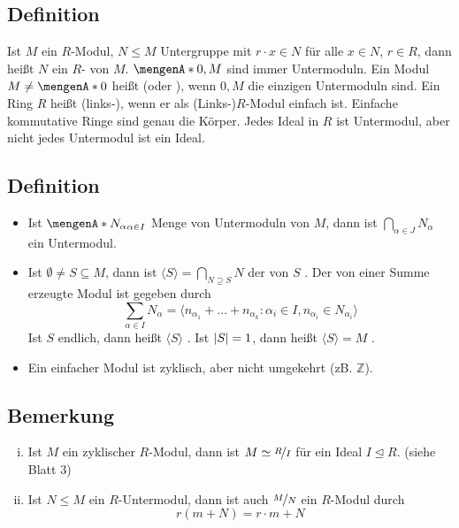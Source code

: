 \subsection[Definition: Untermodul, einfache Moduln und Ringe]{Definition} %
\label{sub:24}
Ist $M$ ein $R$-Modul, $N \le M$ Untergruppe mit $r \cdot x \in N$ für alle $x \in N$, $r \in R$, dann heißt $N$ ein $R$- von $M$.
$\set{0}, M $ sind immer Untermoduln. Ein Modul $M \not= \set{0}$ heißt  (oder ), wenn $0,M$ die einzigen Untermoduln sind. Ein Ring $R$
heißt (links-), wenn er als (Links-)$R$-Modul einfach ist.  
Einfache kommutative Ringe sind genau die Körper. Jedes Ideal in $R$ ist Untermodul, aber nicht jedes Untermodul ist ein Ideal.

\subsection[Definition: erzeugte Untermoduln]{Definition} %
\label{sub:25}
\begin{itemize}
	\item Ist $\set{N_\alpha}_{\alpha \in I} $ Menge von Untermoduln von $M$, dann ist $\bigcap_{\alpha \in J} N_\alpha$ ein Untermodul.
	\item Ist $\emptyset \not= S \subseteq M$, dann ist $\langle S \rangle = \bigcap_{N \supseteq S} N$ der von $S$ . Der von einer Summe 
	erzeugte Modul ist gegeben durch
	\[
		\sum_{\alpha \in I} N_\alpha = \langle n_{\alpha_1} + \ldots + n_{\alpha_k} : \alpha_i \in I, n_{\alpha_i} \in N_{\alpha_i}\rangle
	\] 
	Ist $S$ endlich, dann heißt $\langle S \rangle$ . Ist $\abs*{S}=1 $, dann heißt $\langle S \rangle = M$ .
	\item Ein einfacher Modul ist zyklisch, aber nicht umgekehrt (zB. $\mathds{Z}$).   
\end{itemize}

\subsection[Bemerkung zu Modulstrukturen auf Quotienten]{Bemerkung} %
\label{sub:26}
\begin{enumerate}[(i)]
	\item Ist $M$ ein zyklischer $R$-Modul, dann ist $M \simeq \nicefrac{R}{I}$ für ein Ideal $I \unlhd R$. (siehe Blatt 3)
	\item Ist $N \le M$ ein $R$-Untermodul, dann ist auch $\nicefrac{M}{N}$ ein $R$-Modul durch 
	\[
		r(m + N) = r \cdot m + N
	\]
\end{enumerate}

